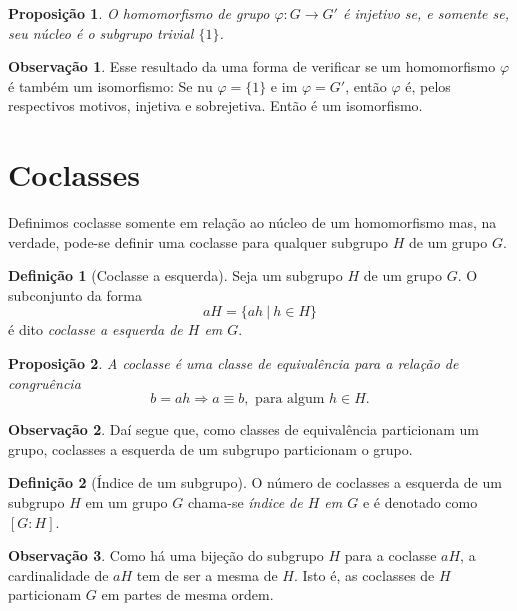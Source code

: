 \documentclass[a4paper,12pt]{report}
\theoremstyle{plain}
\newtheorem{proposicao}{Proposição}[section]
\theoremstyle{definition}
\newtheorem{definicao}{Definição}[section]
\newtheorem{observacao}{Observação}[section]
\begin{document}
\begin{proposicao}
	O homomorfismo de grupo
	\(\varphi: G\longrightarrow G'\) é injetivo se, e somente se, seu núcleo
	é o subgrupo trivial \(\{1\}\).	
\end{proposicao}

\begin{observacao}
	Esse resultado da uma forma de verificar se um homomorfismo \(\varphi\)
	é também um isomorfismo: Se \(\text{nu }\varphi = \{1\}\) e
	\(\text{im } \varphi = G'\), então \(\varphi\) é, pelos respectivos
	motivos, injetiva e sobrejetiva. Então é um isomorfismo.
\end{observacao}

\section{Coclasses}

Definimos coclasse somente em relação ao núcleo de um homomorfismo mas,
na verdade, pode-se definir uma coclasse para qualquer subgrupo \(H\) de
um grupo \(G\).

\begin{definicao}[Coclasse a esquerda]
	Seja um subgrupo \(H\) de um grupo \(G\). O
	subconjunto da forma \[aH = \{ah \ | \ h\in H\}\] é dito \emph{coclasse a esquerda de \(H\) em \(G\)}.
\end{definicao}

\begin{proposicao}
	A coclasse é uma classe de equivalência para a
	relação de congruência
	\[b = ah \Rightarrow a \equiv b, \text{ para algum } h\in H.\]	
\end{proposicao}

\begin{observacao}
	Daí segue que, como classes de equivalência particionam um grupo,
	coclasses a esquerda de um subgrupo particionam o grupo.
\end{observacao}

\begin{definicao}[Índice de um subgrupo]
	O número de coclasses a esquerda de um subgrupo
	\(H\) em um grupo \(G\) chama-se \emph{índice de \(H\) em \(G\)} e é
	denotado como \([G:H]\).	
\end{definicao}

\begin{observacao}
	Como há uma bijeção do subgrupo \(H\) para a coclasse \(aH\), a
	cardinalidade de \(aH\) tem de ser a mesma de \(H\). Isto é, as
	coclasses de \(H\) particionam \(G\) em partes de mesma ordem.
\end{observacao}
\end{document}
